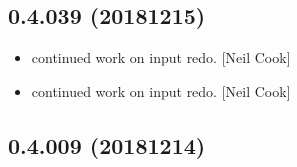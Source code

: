 \documentclass[a4paper,10pt,english]{report}
\begin{document}
\subsection{0.4.039 (2018\sphinxhyphen{}12\sphinxhyphen{}15)}
\label{\detokenize{misc/changelog:id250}}\begin{itemize}
\item {} 
 \sphinxhyphen{} continued work on input redo. {[}Neil Cook{]}

\item {} 
 \sphinxhyphen{} continued work on input redo. {[}Neil Cook{]}

\end{itemize}


\subsection{0.4.009 (2018\sphinxhyphen{}12\sphinxhyphen{}14)}
\end{document}
